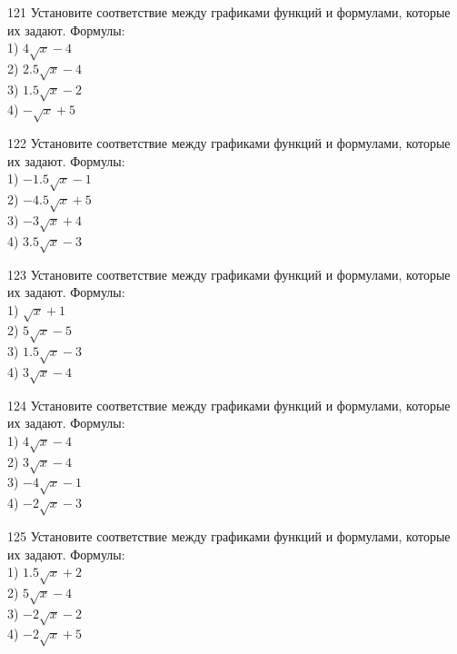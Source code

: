 \documentclass[4apaper]{article}
\begin{document}
\begin{taskBN}{121}
Установите соответствие между графиками функций и формулами, которые их задают. Формулы: \\1) $4\sqrt{x}-4$\\2) $2.5\sqrt{x}-4$\\3) $1.5\sqrt{x}-2$\\4) $-\sqrt{x}+5$
\end{taskBN}

\begin{taskBN}{122}
Установите соответствие между графиками функций и формулами, которые их задают. Формулы: \\1) $-1.5\sqrt{x}-1$\\2) $-4.5\sqrt{x}+5$\\3) $-3\sqrt{x}+4$\\4) $3.5\sqrt{x}-3$
\end{taskBN}

\begin{taskBN}{123}
Установите соответствие между графиками функций и формулами, которые их задают. Формулы: \\1) $\sqrt{x}+1$\\2) $5\sqrt{x}-5$\\3) $1.5\sqrt{x}-3$\\4) $3\sqrt{x}-4$
\end{taskBN}

\begin{taskBN}{124}
Установите соответствие между графиками функций и формулами, которые их задают. Формулы: \\1) $4\sqrt{x}-4$\\2) $3\sqrt{x}-4$\\3) $-4\sqrt{x}-1$\\4) $-2\sqrt{x}-3$
\end{taskBN}

\begin{taskBN}{125}
Установите соответствие между графиками функций и формулами, которые их задают. Формулы: \\1) $1.5\sqrt{x}+2$\\2) $5\sqrt{x}-4$\\3) $-2\sqrt{x}-2$\\4) $-2\sqrt{x}+5$
\end{taskBN}
\end{document}
